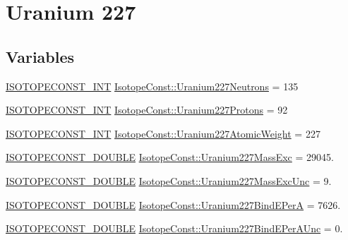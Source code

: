 \hypertarget{group___isotope_const-_uranium-_u227}{}\section{Uranium 227}
\label{group___isotope_const-_uranium-_u227}
\subsection*{Variables}
\begin{DoxyCompactItemize}
\item 
\mbox{\hyperlink{group___isotope_const-_macros_ga5f18360b3e99483a35c32d789e62621c}{I\+S\+O\+T\+O\+P\+E\+C\+O\+N\+S\+T\+\_\+\+I\+NT}} \mbox{\hyperlink{group___isotope_const-_uranium-_u227_ga9b46afefd6bc67fe6a1e476a9cc0119a}{Isotope\+Const\+::\+Uranium227\+Neutrons}} = 135
\item 
\mbox{\hyperlink{group___isotope_const-_macros_ga5f18360b3e99483a35c32d789e62621c}{I\+S\+O\+T\+O\+P\+E\+C\+O\+N\+S\+T\+\_\+\+I\+NT}} \mbox{\hyperlink{group___isotope_const-_uranium-_u227_ga877e1f0e7dd7cfd56d325d72d1a9c60c}{Isotope\+Const\+::\+Uranium227\+Protons}} = 92
\item 
\mbox{\hyperlink{group___isotope_const-_macros_ga5f18360b3e99483a35c32d789e62621c}{I\+S\+O\+T\+O\+P\+E\+C\+O\+N\+S\+T\+\_\+\+I\+NT}} \mbox{\hyperlink{group___isotope_const-_uranium-_u227_ga7ab5c2d33e270f1719fa94b88450a890}{Isotope\+Const\+::\+Uranium227\+Atomic\+Weight}} = 227
\item 
\mbox{\hyperlink{group___isotope_const-_macros_ga8f45a7272ce02c0b4c65c44636ed719a}{I\+S\+O\+T\+O\+P\+E\+C\+O\+N\+S\+T\+\_\+\+D\+O\+U\+B\+LE}} \mbox{\hyperlink{group___isotope_const-_uranium-_u227_gaf24f8c3a6021741b0d3d0ea7c4964bd7}{Isotope\+Const\+::\+Uranium227\+Mass\+Exc}} = 29045.
\item 
\mbox{\hyperlink{group___isotope_const-_macros_ga8f45a7272ce02c0b4c65c44636ed719a}{I\+S\+O\+T\+O\+P\+E\+C\+O\+N\+S\+T\+\_\+\+D\+O\+U\+B\+LE}} \mbox{\hyperlink{group___isotope_const-_uranium-_u227_ga3e45576a32956d591d93eb293745eafb}{Isotope\+Const\+::\+Uranium227\+Mass\+Exc\+Unc}} = 9.
\item 
\mbox{\hyperlink{group___isotope_const-_macros_ga8f45a7272ce02c0b4c65c44636ed719a}{I\+S\+O\+T\+O\+P\+E\+C\+O\+N\+S\+T\+\_\+\+D\+O\+U\+B\+LE}} \mbox{\hyperlink{group___isotope_const-_uranium-_u227_ga0955a3640b01a54a0a77c6b6a7e835a0}{Isotope\+Const\+::\+Uranium227\+Bind\+E\+PerA}} = 7626.
\item 
\mbox{\hyperlink{group___isotope_const-_macros_ga8f45a7272ce02c0b4c65c44636ed719a}{I\+S\+O\+T\+O\+P\+E\+C\+O\+N\+S\+T\+\_\+\+D\+O\+U\+B\+LE}} \mbox{\hyperlink{group___isotope_const-_uranium-_u227_gaf7c615f6c0b63598d4917625d823dadc}{Isotope\+Const\+::\+Uranium227\+Bind\+E\+Per\+A\+Unc}} = 0.

\end{DoxyCompactItemize}
